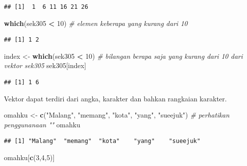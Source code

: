 \documentclass[a4paper, nobind]{templates/ociamthesis}
\newenvironment{Shaded}{\begin{snugshade}}{\end{snugshade}}
\newcommand{\CommentTok}[1]{\textcolor[rgb]{0.56,0.35,0.01}{\textit{#1}}}
\newcommand{\DecValTok}[1]{\textcolor[rgb]{0.00,0.00,0.81}{#1}}
\newcommand{\FunctionTok}[1]{\textcolor[rgb]{0.13,0.29,0.53}{\textbf{#1}}}
\newcommand{\NormalTok}[1]{#1}
\newcommand{\OtherTok}[1]{\textcolor[rgb]{0.56,0.35,0.01}{#1}}
\newcommand{\SpecialCharTok}[1]{\textcolor[rgb]{0.81,0.36,0.00}{\textbf{#1}}}
\newcommand{\StringTok}[1]{\textcolor[rgb]{0.31,0.60,0.02}{#1}}
\renewenvironment{Shaded}
{
  \vspace{10pt}%
  \begin{snugshade}%
}{%
  \end{snugshade}%
  \vspace{8pt}%
}
\begin{document}
\begin{verbatim}
## [1]  1  6 11 16 21 26
\end{verbatim}

\begin{Shaded}
\begin{Highlighting}[]
\FunctionTok{which}\NormalTok{(sek305 }\SpecialCharTok{\textless{}} \DecValTok{10}\NormalTok{) }\CommentTok{\# elemen keberapa yang kurang dari 10}
\end{Highlighting}
\end{Shaded}

\begin{verbatim}
## [1] 1 2
\end{verbatim}

\begin{Shaded}
\begin{Highlighting}[]
\NormalTok{index }\OtherTok{\textless{}{-}} \FunctionTok{which}\NormalTok{(sek305 }\SpecialCharTok{\textless{}} \DecValTok{10}\NormalTok{) }\CommentTok{\# bilangan berapa saja yang kurang dari 10 dari vektor sek305 }
\NormalTok{sek305[index]}
\end{Highlighting}
\end{Shaded}

\begin{verbatim}
## [1] 1 6
\end{verbatim}

Vektor dapat terdiri dari angka, karakter dan bahkan rangkaian karakter.

\begin{Shaded}
\begin{Highlighting}[]
\NormalTok{omahku }\OtherTok{\textless{}{-}} \FunctionTok{c}\NormalTok{(}\StringTok{"Malang"}\NormalTok{, }\StringTok{"memang"}\NormalTok{, }\StringTok{"kota"}\NormalTok{, }\StringTok{"yang"}\NormalTok{, }\StringTok{"sueejuk"}\NormalTok{) }\CommentTok{\# perhatikan penggunanaan ""}
\NormalTok{omahku}
\end{Highlighting}
\end{Shaded}

\begin{verbatim}
## [1] "Malang"  "memang"  "kota"    "yang"    "sueejuk"
\end{verbatim}

\begin{Shaded}
\begin{Highlighting}[]
\NormalTok{omahku[}\FunctionTok{c}\NormalTok{(}\DecValTok{3}\NormalTok{,}\DecValTok{4}\NormalTok{,}\DecValTok{5}\NormalTok{)]}
\end{Highlighting}
\end{Shaded}
\end{document}
